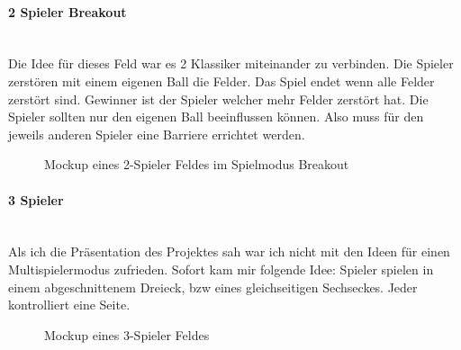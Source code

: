 \paragraph{2 Spieler Breakout}
\mbox{}\\
Die Idee für dieses Feld war es 2 Klassiker miteinander zu verbinden. Die Spieler zerstören mit einem eigenen Ball die Felder. Das Spiel endet wenn alle Felder zerstört sind. Gewinner ist der Spieler welcher mehr Felder zerstört hat.
\newline
Die Spieler sollten nur den eigenen Ball beeinflussen können. Also muss für den jeweils anderen Spieler eine Barriere errichtet werden.
\newline
\begin{figure}[ht]
	\begin{center}
	\end{center}
	\caption{Mockup eines 2-Spieler Feldes im Spielmodus Breakout}
	\label{figx}
\end{figure}
\newpage
\paragraph{3 Spieler}
\mbox{}\\
Als ich die Präsentation des Projektes sah war ich nicht mit den Ideen für einen Multispielermodus zufrieden. Sofort kam mir folgende Idee:
 Spieler spielen in einem abgeschnittenem Dreieck, bzw eines gleichseitigen Sechseckes. Jeder kontrolliert eine Seite.
\newline
\begin{figure}[ht]
	\begin{center}
	\end{center}
	\caption{Mockup eines 3-Spieler Feldes}
	\label{figx}
\end{figure}
\newpage

